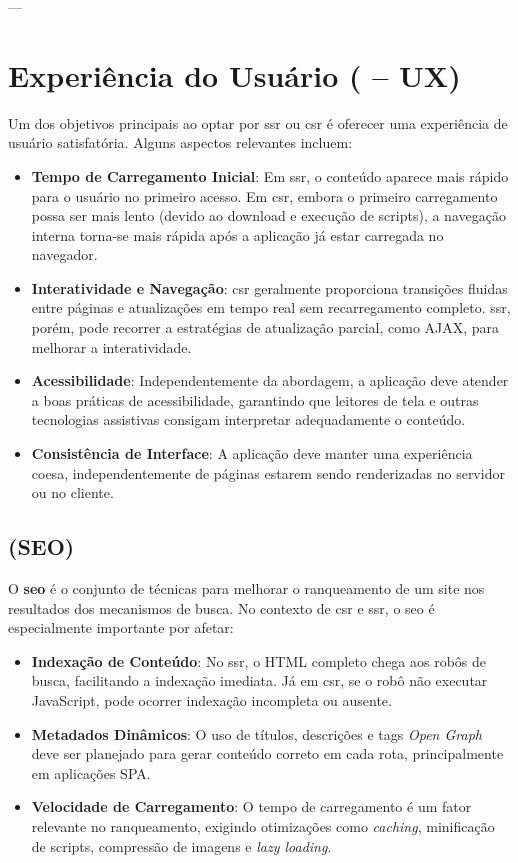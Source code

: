 ---

\section{Experiência do Usuário ( – UX)}
\label{sec:ux}
Um dos objetivos principais ao optar por \acrshort{ssr} ou \acrshort{csr} é oferecer uma experiência de usuário satisfatória. Alguns aspectos relevantes incluem:

\begin{itemize}
    \item \textbf{Tempo de Carregamento Inicial}: Em \acrshort{ssr}, o conteúdo aparece mais rápido para o usuário no primeiro acesso. Em \acrshort{csr}, embora o primeiro carregamento possa ser mais lento (devido ao download e execução de scripts), a navegação interna torna-se mais rápida após a aplicação já estar carregada no navegador.
    \item \textbf{Interatividade e Navegação}: \acrshort{csr} geralmente proporciona transições fluidas entre páginas e atualizações em tempo real sem recarregamento completo. \acrshort{ssr}, porém, pode recorrer a estratégias de atualização parcial, como AJAX, para melhorar a interatividade.
    \item \textbf{Acessibilidade}: Independentemente da abordagem, a aplicação deve atender a boas práticas de acessibilidade, garantindo que leitores de tela e outras tecnologias assistivas consigam interpretar adequadamente o conteúdo.
    \item \textbf{Consistência de Interface}: A aplicação deve manter uma experiência coesa, independentemente de páginas estarem sendo renderizadas no servidor ou no cliente.
\end{itemize}

\subsection{ (SEO)}
\label{sec:seo}
O \textbf{\acrshort{seo}} é o conjunto de técnicas para melhorar o ranqueamento de um site nos resultados dos mecanismos de busca. No contexto de \acrshort{csr} e \acrshort{ssr}, o \acrshort{seo} é especialmente importante por afetar:

\begin{itemize}
    \item \textbf{Indexação de Conteúdo}: No \acrshort{ssr}, o HTML completo chega aos robôs de busca, facilitando a indexação imediata. Já em \acrshort{csr}, se o robô não executar JavaScript, pode ocorrer indexação incompleta ou ausente.
    \item \textbf{Metadados Dinâmicos}: O uso de títulos, descrições e tags \textit{Open Graph} deve ser planejado para gerar conteúdo correto em cada rota, principalmente em aplicações SPA.
    \item \textbf{Velocidade de Carregamento}: O tempo de carregamento é um fator relevante no ranqueamento, exigindo otimizações como \textit{caching}, minificação de scripts, compressão de imagens e \textit{lazy loading}.
\end{itemize}

